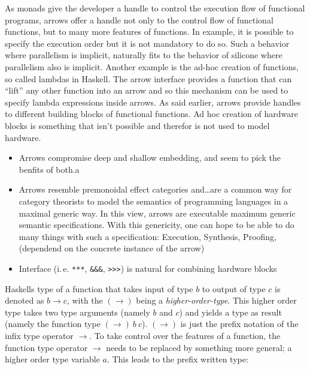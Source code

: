 \documentclass[9pt,final,a4paper,leqno]{article}
\newcommand{\hs}[1]{\mbox{\lstinline[basicstyle=\color{textgray}]!#1!}}
\begin{document}
\par
As monads give the developer a handle to control the execution flow of functional programs, arrows offer a handle not only to the control
flow of functional functions, but to many more features of functions. In example, it is possible to specify the execution order but it is
not mandatory to do so. Such a behavior where parallelism is implicit, naturally fits to the behavior of silicone where parallelism also is
implicit. Another example is the ad-hoc creation of functions, so called lambdas in Haskell. The arrow interface provides a function that
can ``lift'' any other function into an arrow and so this mechanism can be used to specify lambda expressions inside arrows. As said
earlier, arrows provide handles to different building blocks of functional functions. Ad hoc creation of hardware blocks is something that
isn't possible and therefor is not used to model hardware. %

\begin{itemize}
\item Arrows compromise deep and shallow embedding, and seem to pick the benfits of both.a
\item Arrows resemble premonoidal effect categories and\ldots   are a common way for category theorists to model the
semantics of programming languages in a maximal generic way. In this view, arrows are executable maximum generic
semantic specifications. With this genericity, one can hope to be able to do many things with such a specification:
Execution, Synthesis, Proofing, (dependend on the concrete instance of the arrow)
\item Interface (i.\,e. \hs{***}, \hs{&&&}, \hs{>>>}) is natural for combining hardware blocks
\end{itemize}

\par
Haskells type of a function that takes input of type $b$ to output of type $c$ is denoted as $b \rightarrow c$, with the $(\rightarrow)$
being a \emph{higher-order-type}. This higher order type takes two type arguments (namely $b$ and $c$) and yields a type as result (namely
the function type $(\rightarrow)\ b\ c$). $(\rightarrow)$ is just the prefix notation of the infix type operator $\rightarrow$. To take
control over the features of a function, the function type operator $\rightarrow$ needs to be replaced by something more general; a higher
order type variable $a$. This leads to the prefix written type:
\end{document}
